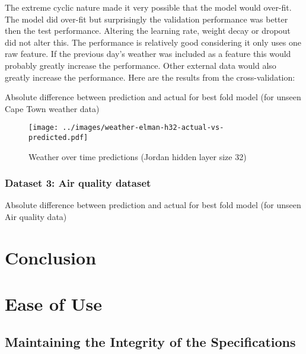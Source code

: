 \documentclass[conference]{IEEEtran}
\begin{document}
The extreme cyclic nature made it very possible that the model would over-fit. The model did over-fit but surprisingly the validation performance was better then the test performance. Altering the learning rate, weight decay or dropout did not alter this. The performance is relatively good considering it only uses one raw feature. If the previous day's weather was included as a feature this would probably greatly increase the performance. Other external data would also greatly increase the performance. Here are the results from the cross-validation:

\begin{table}[htbp]
	\caption{Absolute difference between prediction and actual for best fold model (for unseen Cape Town weather data)}
	\label{tab:weather-rnn-summary}
\end{table}

\begin{figure}[H] 
	\centering
	\texttt{[image: ../images/weather-elman-h32-actual-vs-predicted.pdf]}
	\caption{Weather over time predictions (Jordan hidden layer size 32)}
	\label{fig:weather-predictions-elman}
\end{figure}

\subsubsection{Dataset 3: Air quality dataset}

\begin{table}[htbp]
	\caption{Absolute difference between prediction and actual for best fold model (for unseen Air quality data)}
	\label{tab:weather-rnn-summary}
\end{table}

\section{Conclusion}

\section{Ease of Use}

\subsection{Maintaining the Integrity of the Specifications}
\end{document}
